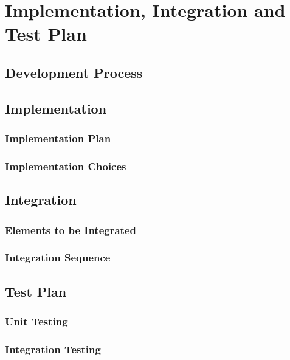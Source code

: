 \documentclass[../DD.tex]{subfiles}
\begin{document}
\chapter{Implementation, Integration and Test Plan}
\thispagestyle{fancy}

\section{Development Process\label{5.1}}


\section{Implementation\label{5.2}}

\subsection{Implementation Plan\label{5.2.1}}


\subsection{Implementation Choices\label{5.2.2}}



\section{Integration\label{5.3}}

\subsection{Elements to be Integrated\label{5.3.1}}


\subsection{Integration Sequence\label{5.3.2}}



\section{Test Plan\label{5.4}}

\subsection{Unit Testing\label{5.4.1}}


\subsection{Integration Testing\label{5.4.2}}

\end{document}
